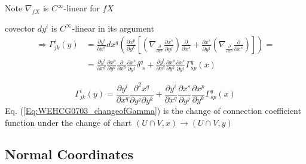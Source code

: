 Note $\nabla_{fX}$ is $C^{\infty}$-linear for $fX$

covector $dy^i$ is $C^{\infty}$-linear in its argument
\[
\begin{aligned}
\Longrightarrow \Gamma_{jk}^i(y) & = \frac{ \partial y^i}{ \partial x^q} dx^q \left( \frac{ \partial x^p}{ \partial y^k} \left[ \left( \nabla_{ \frac{ \partial }{ \partial x^p} } \frac{ \partial x^s}{ \partial y^j} \right) \frac{ \partial }{ \partial x^s} + \frac{ \partial x^s}{ \partial y^j} \left( \nabla_{ \frac{ \partial }{ \partial x^p } } \frac{ \partial }{ \partial x^s } \right)  \right] \right) = \\
& = \frac{ \partial y^i}{ \partial x^q} \frac{ \partial x^p }{ \partial y^k} \frac{ \partial }{ \partial x^p } \frac{ \partial x^s}{ \partial y^j } \delta^q_{ \, \, s} + \frac{ \partial y^i}{ \partial x^q} \frac{ \partial x^p }{ \partial y^k} \frac{ \partial x^s}{ \partial y^j} \Gamma^q_{sp}(x)
\end{aligned}
\]


\begin{equation}\label{Eq:WEHCG0703_changeofGamma}
\Gamma^i_{jk}(y) = \frac{ \partial y^i}{ \partial x^q} \frac{ \partial^2 x^q}{ \partial y^j \partial y^k} + \frac{ \partial y^i}{ \partial x^q } \frac{ \partial x^s }{ \partial y^j} \frac{ \partial x^p }{ \partial y^k} \Gamma^q_{sp}(x)
\end{equation}
Eq. (\ref{Eq:WEHCG0703_changeofGamma}) is the change of connection coefficient function under the change of chart $(U\cap V,x) \to (U\cap V,y)$


\subsection{Normal Coordinates}
